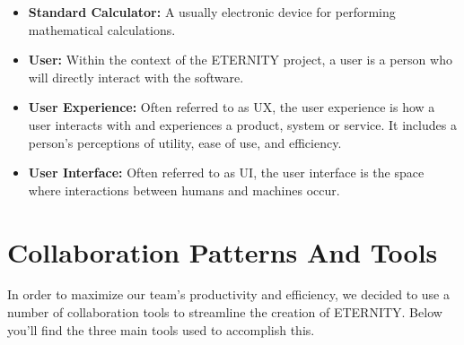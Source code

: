 \documentclass[11pt,onside]{report}
\begin{document}
\begin{itemize}
    \item \textbf{Standard Calculator:} A usually electronic device for performing mathematical calculations. \cite{calculator}
    
    \item \textbf{User:} Within the context of the ETERNITY project, a user is a person who will directly interact with the software.
    
    \item \textbf{User Experience:} Often referred to as UX, the user experience is how a user interacts with and experiences a product, system or service. It includes a person's perceptions of utility, ease of use, and efficiency. \cite{ux}
    
    \item \textbf{User Interface:} Often referred to as UI, the user interface is the space where interactions between humans and machines occur. \cite{ui}
    
\end{itemize}

\section{Collaboration Patterns And Tools}
\begin{description}
In order to maximize our team's productivity and efficiency, we decided to use a number of collaboration tools to streamline the creation of ETERNITY. Below you'll find the three main tools used to accomplish this.
\end{description}
\end{document}
